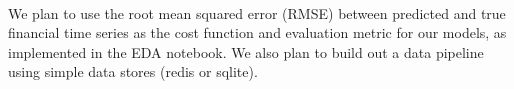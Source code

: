 \documentclass{article}
\begin{document}
\paragraph{}
We plan to use the root mean squared error (RMSE) between predicted and true financial time series as the cost function and evaluation metric for our models, as implemented in the EDA notebook. We also plan to build out a data pipeline using simple data stores (redis or sqlite).






\end{document}
